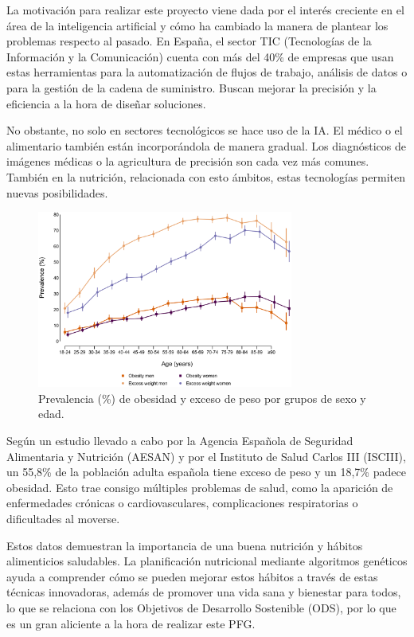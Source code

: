 La motivación para realizar este proyecto viene dada por el interés creciente en el área de la inteligencia artificial y cómo ha cambiado la manera de plantear los problemas respecto al pasado. En España, el sector TIC (Tecnologías de la Información y la Comunicación) cuenta con más del 40\% de empresas que usan estas herramientas para la automatización de flujos de trabajo, análisis de datos o para la gestión de la cadena de suministro. Buscan mejorar la precisión y la eficiencia a la hora de diseñar soluciones.

No obstante, no solo en sectores tecnológicos se hace uso de la IA. El médico o el alimentario también están incorporándola de manera gradual. Los diagnósticos de imágenes médicas o la agricultura de precisión son cada vez más comunes. También en la nutrición, relacionada con esto ámbitos, estas tecnologías permiten nuevas posibilidades.

\begin{figure}[H]
    \centering
    \includegraphics[width=0.75\textwidth]{figures/prevalencia-obesidad.png}
    \caption{Prevalencia (\%) de obesidad y exceso de peso por grupos de sexo y edad.}
    \label{fig:prevalencia-obesidad}
\end{figure}

Según un estudio llevado a cabo por la Agencia Española de Seguridad Alimentaria y Nutrición (AESAN) y por el Instituto de Salud Carlos III (ISCIII), un 55,8\% de la población adulta española tiene exceso de peso y un 18,7\% padece obesidad. Esto trae consigo múltiples problemas de salud, como la aparición de enfermedades crónicas o cardiovasculares, complicaciones respiratorias o dificultades al moverse.

Estos datos demuestran la importancia de una buena nutrición y hábitos alimenticios saludables. La planificación nutricional mediante algoritmos genéticos ayuda a comprender cómo se pueden mejorar estos hábitos a través de estas técnicas innovadoras, además de promover una vida sana y bienestar para todos, lo que se relaciona con los Objetivos de Desarrollo Sostenible (ODS), por lo que es un gran aliciente a la hora de realizar este PFG.



